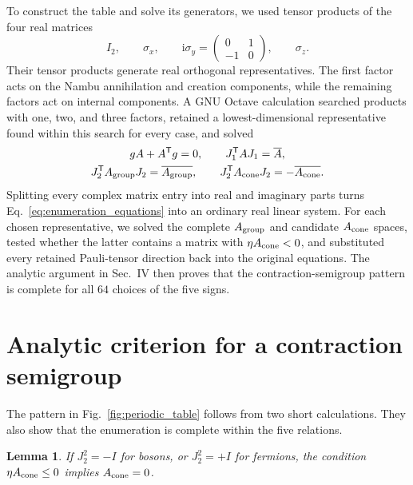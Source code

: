 \documentclass[onecolumn,aps,prb,amsmath,amssymb,superscriptaddress,longbibliography,floatfix]{revtex4-2}
\newcommand{\ii}{\mathrm{i}}
\newcommand{\trans}{\mathsf{T}}
\newtheorem{lemma}{Lemma}
\begin{document}
\FloatBarrier

To construct the table and solve its generators, we used tensor products of the
four real matrices
\begin{equation}
    I_2,\qquad \sigma_x,\qquad
    \ii\sigma_y=\begin{pmatrix}0&1\\-1&0\end{pmatrix},
    \qquad \sigma_z .
    \label{eq:real_pauli_basis}
\end{equation}
Their tensor products generate real orthogonal representatives.  The first
factor acts on the Nambu annihilation and creation components, while the
remaining factors act on internal components.  A GNU Octave calculation
searched products with one, two, and three factors, retained a
lowest-dimensional representative found within this search for every case, and
solved
\begin{equation}
\begin{gathered}
    gA+A^\trans g=0,\qquad
    J_1^\trans AJ_1=\overline A,\\
    J_2^\trans A_{\rm group}J_2=\overline{A_{\rm group}},\qquad
    J_2^\trans A_{\rm cone}J_2=-\overline{A_{\rm cone}}.
\end{gathered}
    \label{eq:enumeration_equations}
\end{equation}
Splitting every complex matrix entry into real and imaginary parts turns
Eq.~\eqref{eq:enumeration_equations} into an ordinary real linear system.  For
each chosen representative, we solved the complete \(A_{\rm group}\) and
candidate \(A_{\rm cone}\) spaces, tested whether the latter contains a matrix
with \(\eta A_{\rm cone}<0\), and substituted every retained Pauli-tensor
direction back into the original equations.  The analytic argument in Sec.~IV
then proves that the contraction-semigroup pattern is complete for all \(64\)
choices of the five signs.

\section{Analytic criterion for a contraction semigroup}

The pattern in Fig.~\ref{fig:periodic_table} follows from two short calculations.  They also show that the enumeration is complete within the five relations.

\begin{lemma}
If \(J_2^2=-I\) for bosons, or \(J_2^2=+I\) for fermions, the condition \(\eta A_{\rm cone}\leq0\) implies \(A_{\rm cone}=0\).
\label{lem:J2_square}
\end{lemma}
\end{document}

